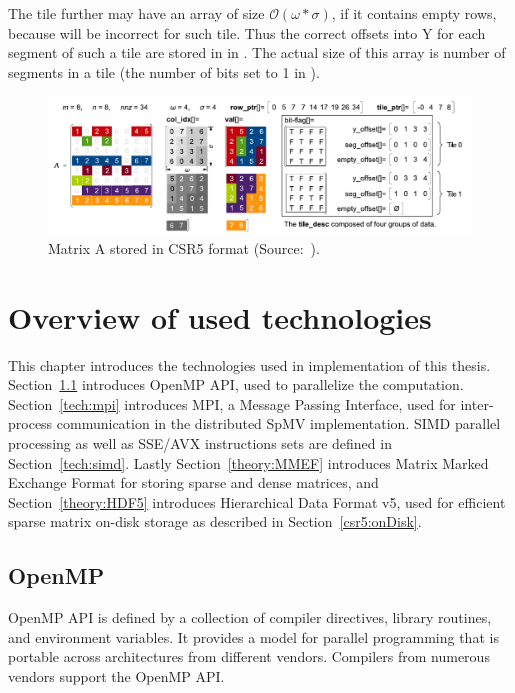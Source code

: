 \documentclass[thesis=M,english]{FITthesis}[2019/12/23]
\begin{document}
The tile further may have an  array of size \(\mathcal{O}(\omega * \sigma)\), if it contains empty rows,
because  will be incorrect for such tile. Thus the correct offsets into Y  for each segment of such
a tile are stored in in . The actual size of this array is number of segments in a tile (the number of bits set to 1 in ).

\begin{figure}[htp]
    \centering
    \includegraphics[scale=0.7]{static/A_csr5.pdf}
    \caption{Matrix A stored in CSR5 format (Source:~\cite{liu2015csr5}).}
\end{figure}



\chapter{Overview of used technologies}\label{tech}

This chapter introduces the technologies used in implementation of this thesis. Section~\ref{tech:omp} introduces
OpenMP API, used to parallelize the computation. Section~\ref{tech:mpi} introduces MPI, a Message Passing
Interface, used for inter-process communication in the distributed SpMV implementation. SIMD parallel
processing as well as SSE/AVX instructions sets are defined in Section~\ref{tech:simd}. Lastly
Section~\ref{theory:MMEF} introduces Matrix Marked Exchange Format for storing sparse and dense matrices,
and Section~\ref{theory:HDF5} introduces Hierarchical Data Format v5, used for efficient sparse matrix
on-disk storage as described in Section~\ref{csr5:onDisk}.

\section{OpenMP}\label{tech:omp}

OpenMP API is defined by a collection of compiler directives, library routines, and environment variables.
It provides a model for parallel programming that is portable across architectures
from different vendors. Compilers from numerous vendors support the OpenMP API\cite{openmp18}.
\end{document}
